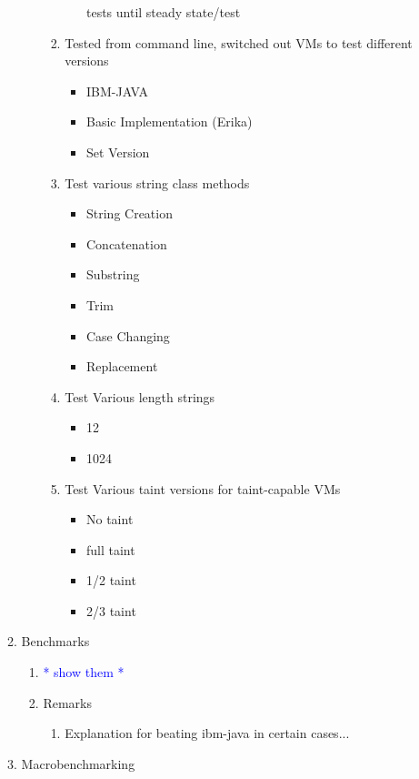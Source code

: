 \documentclass[times,11pt]{article}
\begin{document}
\begin{enumerate}
\begin{enumerate}
\begin{enumerate}
\begin{enumerate}
\begin{itemize}
						tests until steady state/test
					\end{itemize}
				\item Tested from command line, switched out VMs to test 
					different versions
					\begin{itemize}
					\item IBM-JAVA
					\item Basic Implementation (Erika)
					\item Set Version
					\end{itemize}
				\item Test various string class methods
					\begin{itemize}
					\item String Creation
					\item Concatenation
					\item Substring
					\item Trim
					\item Case Changing
					\item Replacement
					\end{itemize}
				\item Test Various length strings
					\begin{itemize}
					\item 12
					\item 1024
					\end{itemize}
				\item Test Various taint versions for taint-capable VMs
					\begin{itemize}
					\item No taint
					\item full taint
					\item 1/2 taint
					\item 2/3 taint
					\end{itemize}
				\end{enumerate}
			\end{enumerate}
		\item Benchmarks
			\begin{enumerate}
			\item \textcolor{blue}{* show them *}
			\item Remarks
				\begin{enumerate}
				\item Explanation for beating ibm-java in certain cases...
				\end{enumerate}
			\end{enumerate}
		\item Macrobenchmarking

\end{enumerate}
\end{enumerate}
\end{document}
